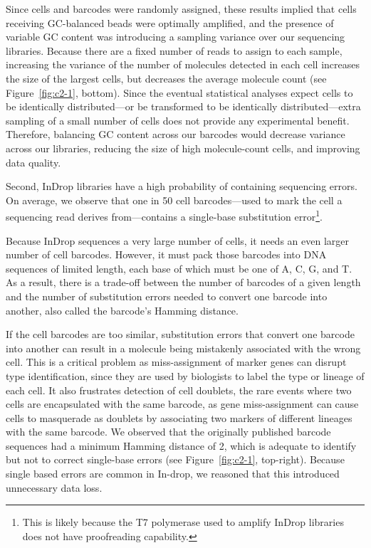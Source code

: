 Since cells and barcodes were randomly assigned, these results implied that cells receiving GC-balanced beads were optimally amplified, and the presence of variable GC content was introducing a sampling variance over our sequencing libraries.
Because there are a fixed number of reads to assign to each sample, increasing the variance of the number of molecules detected in each cell increases the size of the largest cells, but decreases the average molecule count (see Figure~\ref{fig:c2-1}, bottom).
Since the eventual statistical analyses expect cells to be identically distributed---or be transformed to be identically distributed---extra sampling of a small number of cells does not provide any experimental benefit. 
Therefore, balancing GC content across our barcodes would decrease variance across our libraries, reducing the size of high molecule-count cells, and improving data quality. 

Second, InDrop libraries have a high probability of containing sequencing errors. 
On average, we observe that one in 50 cell barcodes---used to mark the cell a sequencing read derives from---contains a single-base substitution error\footnote{This is likely because the T7 polymerase used to amplify InDrop libraries does not have proofreading capability.}. 

Because InDrop sequences a very large number of cells, it needs an even larger number of cell barcodes. 
However, it must pack those barcodes into DNA sequences of limited length, each base of which must be one of A, C, G, and T. 
As a result, there is a trade-off between the number of barcodes of a given length and the number of substitution errors needed to convert one barcode into another, also called the barcode's Hamming distance. 

If the cell barcodes are too similar, substitution errors that convert one barcode into another can result in a molecule being mistakenly associated with the wrong cell. 
This is a critical problem as miss-assignment of marker genes can disrupt type identification, since they are used by biologists to label the type or lineage of each cell. 
It also frustrates detection of cell doublets, the rare events where two cells are encapsulated with the same barcode, as gene miss-assignment can cause cells to masquerade as doublets by associating two markers of different lineages with the same barcode. 
We observed that the originally published barcode sequences had a minimum Hamming distance of 2, which is adequate to identify but not to correct single-base errors (see Figure~\ref{fig:c2-1}, top-right).  
Because single based errors are common in In-drop, we reasoned that this introduced unnecessary data loss.


